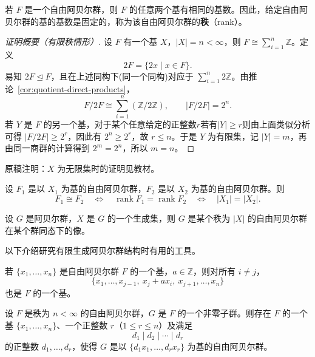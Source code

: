 \begin{theorem}\label{thm:free-abelian-rank}
若 $F$ 是一个自由阿贝尔群，则 $F$ 的任意两个基有相同的基数。因此，给定自由阿贝尔群的基的基数是固定的，称为该自由阿贝尔群的\textbf{秩}（rank）。
\end{theorem}

\begin{proof}[证明概要（有限秩情形）]
设 $F$ 有一个基 $X$，$|X|=n<\infty$，则 $F\cong\sum_{i=1}^{n}\mathbb Z$。定义
\[
  2F=\{2x\mid x\in F\}.
\]
易知 $2F\trianglelefteq F$，且在上述同构下(同一个同构)对应于 $\sum_{i=1}^{n}2\mathbb Z$。由推论~\ref{cor:quotient-direct-products}，
\[
  F/2F\cong\sum_{i=1}^{n}(\mathbb Z/2\mathbb Z),
  \qquad |F/2F|=2^n.
\]
若 $Y$ 是 $F$ 的另一个基，对于某个任意给定的正整数$r$若有$|Y|\geq r$则由上面类似分析可得 $|F/2F| \geq 2^r$，因此有 $2^n \geq 2^r$，故 $r\leq n$。于是 $Y$ 为有限集，记 $|Y|=m$，再由同一商群的计算得到 $2^m=2^n$，所以 $m=n$。
\end{proof}

\begin{purplenote}
原稿注明：$X$ 为无限集时的证明见教材。
\end{purplenote}

\begin{proposition}\label{prop:free-abelian-isomorphism-rank}
设 $F_1$ 是以 $X_1$ 为基的自由阿贝尔群，$F_2$ 是以 $X_2$ 为基的自由阿贝尔群。则
\[
  F_1\cong F_2
  \quad\Longleftrightarrow\quad
  \operatorname{rank}F_1=\operatorname{rank}F_2
  \quad\Longleftrightarrow\quad |X_1|=|X_2|.
\]
\end{proposition}

\begin{theorem}\label{thm:abelian-quotient-of-free-abelian}
设 $G$ 是阿贝尔群，$X$ 是 $G$ 的一个生成集，则 $G$ 是某个秩为 $|X|$ 的自由阿贝尔群在某个群同态下的像。
\end{theorem}

\begin{purplenote}
以下介绍研究有限生成阿贝尔群结构时有用的工具。
\end{purplenote}

\begin{lemma}\label{lem:free-abelian-basis-shear}
若 $\{x_1,\ldots,x_n\}$ 是自由阿贝尔群 $F$ 的一个基，$a\in\mathbb Z$，则对所有 $i\ne j$，
\[
  \{x_1,\ldots,x_{j-1},\ x_j+ax_i,\ x_{j+1},\ldots,x_n\}
\]
也是 $F$ 的一个基。
\end{lemma}

\begin{theorem}\label{thm:subgroup-finite-rank-free-abelian}
设 $F$ 是秩为 $n<\infty$ 的自由阿贝尔群，$G$ 是 $F$ 的一个非零子群。则存在 $F$ 的一个基 $\{x_1,\ldots,x_n\}$、一个正整数 $r$（$1\leq r\leq n$）及满足
\[
  d_1\mid d_2\mid\cdots\mid d_r
\]
的正整数 $d_1,\ldots,d_r$，使得 $G$ 是以 $\{d_1x_1,\ldots,d_rx_r\}$ 为基的自由阿贝尔群。
\end{theorem}

